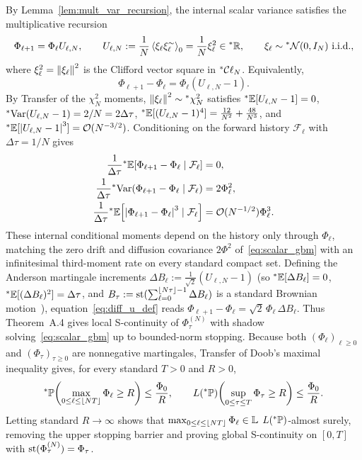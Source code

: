 \begin{proofsketch}
By Lemma~\ref{lem:mult_var_recursion}, the internal scalar variance satisfies the multiplicative recursion
\begin{equation}\label{eq:mult_u_def}
\Phi_{\ell+1} = \Phi_\ell U_{\ell,N}, \qquad U_{\ell,N} := \frac{1}{N}\left\langle \xi_\ell\xi_\ell^{\sim} \right\rangle_0 = \frac{1}{N}\xi_\ell^2 \in {}^*\mathbb{R}, \qquad \xi_\ell \sim {}^*\mathcal{N}(0, I_N) \text{ i.i.d.},
\end{equation}
where $\xi_\ell^2 = \left\lVert \xi_\ell \right\rVert^2$ is the Clifford vector square in ${}^*\mathcal{C}\ell_N$. Equivalently,
\begin{equation}\label{eq:diff_u_def}
\Phi_{\ell+1} - \Phi_\ell = \Phi_\ell (U_{\ell,N} - 1).
\end{equation}
By Transfer of the $\chi_N^2$ moments, $\left\lVert \xi_\ell \right\rVert^2 \sim {}^*\chi_N^2$ satisfies ${}^*\mathbb{E}[U_{\ell,N} - 1] = 0$, ${}^*\!\operatorname{Var}(U_{\ell,N} - 1) = 2/N = 2\Delta\tau$, ${}^*\mathbb{E}[(U_{\ell,N} - 1)^4] = \frac{12}{N^2} + \frac{48}{N^3}$, and ${}^*\mathbb{E}[\left\lvert U_{\ell,N} - 1 \right\rvert^3] = \mathcal{O}(N^{-3/2})$. Conditioning on the forward history $\mathcal{F}_\ell$ with $\Delta\tau = 1/N$ gives
\begin{equation}\label{eq:scalar_cond_moments}
\begin{aligned}
\frac{1}{\Delta\tau}{}^*\mathbb{E}[\Phi_{\ell+1} - \Phi_\ell \mid \mathcal{F}_\ell] &= 0, \\
\frac{1}{\Delta\tau}{}^*\!\operatorname{Var}(\Phi_{\ell+1} - \Phi_\ell \mid \mathcal{F}_\ell) &= 2\Phi_\ell^2, \\
\frac{1}{\Delta\tau}{}^*\mathbb{E}\!\left[\left\lvert \Phi_{\ell+1} - \Phi_\ell \right\rvert^3 \mid \mathcal{F}_\ell\right] &= \mathcal{O}(N^{-1/2})\Phi_\ell^3.
\end{aligned}
\end{equation}
These internal conditional moments depend on the history only through $\Phi_\ell$, matching the zero drift and diffusion covariance $2\Phi^2$ of~\eqref{eq:scalar_gbm} with an infinitesimal third-moment rate on every standard compact set. Defining the Anderson martingale increments $\Delta B_\ell := \frac{1}{\sqrt{2}}(U_{\ell,N} - 1)$ (so ${}^*\mathbb{E}[\Delta B_\ell] = 0$, ${}^*\mathbb{E}[(\Delta B_\ell)^2] = \Delta\tau$, and $B_\tau := \operatorname{st}(\sum_{\ell=0}^{\lfloor N\tau \rfloor - 1} \Delta B_\ell)$ is a standard Brownian motion~\cite{anderson1976nonstandard}), equation~\eqref{eq:diff_u_def} reads $\Phi_{\ell+1} - \Phi_\ell = \sqrt{2}\,\Phi_\ell\,\Delta B_\ell$. Thus Theorem~A.4 gives local S-continuity of $\Phi_\tau^{(N)}$ with shadow solving~\eqref{eq:scalar_gbm} up to bounded-norm stopping. Because both $(\Phi_\ell)_{\ell \ge 0}$ and $(\Phi_\tau)_{\tau \ge 0}$ are nonnegative martingales, Transfer of Doob's maximal inequality gives, for every standard $T > 0$ and $R > 0$,
\begin{equation}\label{eq:doob_maximal}
{}^*\mathbb{P}\!\left(\max_{0 \le \ell \le \lfloor NT \rfloor} \Phi_\ell \ge R\right) \le \frac{\Phi_0}{R}, \qquad L({}^*\mathbb{P})\!\left(\sup_{0 \le \tau \le T} \Phi_\tau \ge R\right) \le \frac{\Phi_0}{R}.
\end{equation}
Letting standard $R \to \infty$ shows that $\max_{0 \le \ell \le \lfloor NT \rfloor} \Phi_\ell \in \mathbb{L}$ $L({}^*\mathbb{P})$-almost surely, removing the upper stopping barrier and proving global S-continuity on $[0, T]$ with $\operatorname{st}(\Phi_\tau^{(N)}) = \Phi_\tau$.


\end{proofsketch}
